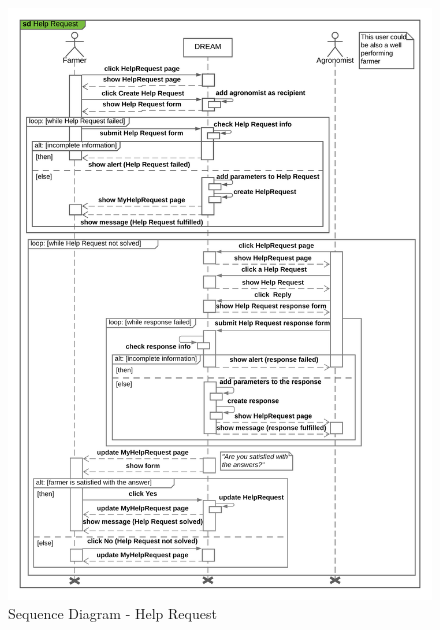 \begin{center}
    \begin{figure}[H]
  \includegraphics[width=\textwidth,height=\textheight,keepaspectratio]{./Images/Sequence Diagram Help Request.png}
  \caption{Sequence Diagram - Help Request}
\end{figure}
\end{center}

